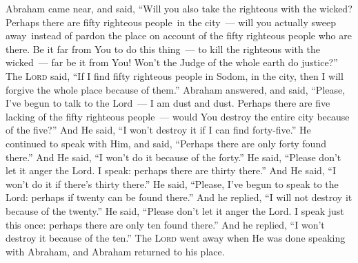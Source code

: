 \begin{inparaenum}
     Abraham came near, and said, ``Will you also take the righteous with the wicked?%
     Perhaps there are fifty righteous people\understood\ in the city~--- will you actually sweep away\understood\ instead of pardon the place on account of the fifty righteous people who are there.%
     Be it far from You to do this thing~--- to kill the righteous with the wicked~--- far be it from You! Won't the Judge of the whole earth do justice?''%
     The \textsc{Lord} said, ``If I find fifty righteous people in Sodom, in the city, then I will forgive the whole place because of them.''%
     Abraham answered, and said, ``Please, I've begun to talk to the Lord~--- I am dust and dust.%
     Perhaps there are five lacking of the fifty righteous people~--- would You destroy the entire city because of the five?'' And He said, ``I won't destroy it if I can find forty-five.''%
     He continued to speak with Him, and said, ``Perhaps there are only forty found there.'' And He said, ``I won't do it because of the forty.''%
     He said, ``Please don't let it anger the Lord. I speak: perhaps there are thirty there.'' And He said, ``I won't do it if there's thirty there.''%
     He said, ``Please, I've begun to speak to the Lord: perhaps if twenty can be found there.'' And he replied, ``I will not destroy it because of the twenty.''%
     He said, ``Please don't let it anger the Lord. I speak just this once: perhaps there are only ten found there.'' And he replied, ``I won't destroy it because of the ten.''%
     The \textsc{Lord} went away when He was done speaking with Abraham, and Abraham returned to his place.%
\end{inparaenum}
